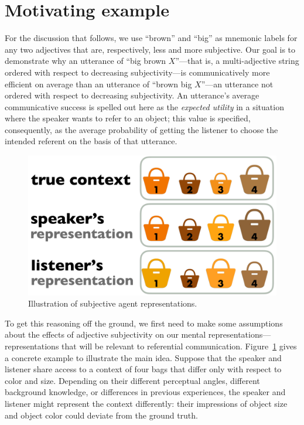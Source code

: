 \documentclass[10pt,a4paper]{article}
\begin{document}
\section{Motivating example}

For the discussion that follows, we use ``brown'' and ``big'' as mnemonic labels for any two adjectives that are, respectively, less and more subjective. Our goal is to demonstrate why an utterance of ``big brown $X$''---that is, a multi-adjective string ordered with respect to decreasing subjectivity---is communicatively more efficient on average than an utterance of ``brown big $X$''---an utterance not ordered with respect to decreasing subjectivity. An utterance's average communicative success is spelled out here as the \emph{expected utility} in a situation where the speaker wants to refer to an object; this value is specified, consequently, as the average probability of getting the listener to choose the intended referent on the basis of that utterance.

\begin{figure}[t]
  \centering
 \includegraphics[width=.95\linewidth]{model_picture.pdf} 
 \vspace{-5pt}
  \caption{Illustration of subjective agent representations.}
  \label{fig:ModelIllustration}
\end{figure}

To get this reasoning off the ground, we first need to make some assumptions about the effects of adjective subjectivity on our mental representations---representations that will be relevant to referential communication. Figure~\ref{fig:ModelIllustration} gives a concrete example to illustrate the main idea. Suppose that the speaker and listener share access to a context of four bags that differ only with respect to color and size. Depending on their different perceptual angles, different background knowledge, or differences in previous experiences, the speaker and listener might represent the context differently: their impressions of object size and object color could deviate from the ground truth. 
\end{document}
